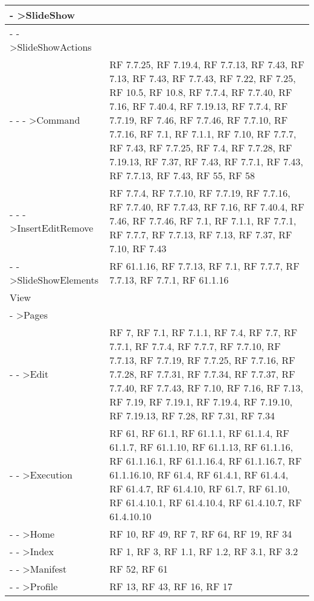 {\begin{longtable} [c]{| p{8cm} | p{5cm} |}
 \hline 
- >SlideShow & \\ 
 \hline 
- - >SlideShowActions & \\ 
 \hline 
- - - >Command & RF 7.7.25, RF 7.19.4, RF 7.7.13, RF 7.43, RF 7.13, RF 7.43, RF 7.7.43, RF 7.22, RF 7.25, RF 10.5, RF 10.8, RF 7.7.4, RF 7.7.40, RF 7.16, RF 7.40.4, RF 7.19.13, RF 7.7.4, RF 7.7.19, RF 7.46, RF 7.7.46, RF 7.7.10, RF 7.7.16, RF 7.1, RF 7.1.1, RF 7.10, RF 7.7.7, RF 7.43, RF 7.7.25, RF 7.4, RF 7.7.28, RF 7.19.13, RF 7.37, RF 7.43, RF 7.7.1, RF 7.43, RF 7.7.13, RF 7.43, RF 55, RF 58\\ 
 \hline 
- - - >InsertEditRemove & RF 7.7.4, RF 7.7.10, RF 7.7.19, RF 7.7.16, RF 7.7.40, RF 7.7.43, RF 7.16, RF 7.40.4, RF 7.46, RF 7.7.46, RF 7.1, RF 7.1.1, RF 7.7.1, RF 7.7.7, RF 7.7.13, RF 7.13, RF 7.37, RF 7.10, RF 7.43\\ 
 \hline 
- - >SlideShowElements & RF 61.1.16, RF 7.7.13, RF 7.1, RF 7.7.7, RF 7.7.13, RF 7.7.1, RF 61.1.16\\ 
 \hline 
View & \\ 
 \hline 
- >Pages & \\ 
 \hline 
- - >Edit & RF 7, RF 7.1, RF 7.1.1, RF 7.4, RF 7.7, RF 7.7.1, RF 7.7.4, RF 7.7.7, RF 7.7.10, RF 7.7.13, RF 7.7.19, RF 7.7.25, RF 7.7.16, RF 7.7.28, RF 7.7.31, RF 7.7.34, RF 7.7.37, RF 7.7.40, RF 7.7.43, RF 7.10, RF 7.16, RF 7.13, RF 7.19, RF 7.19.1, RF 7.19.4, RF 7.19.10, RF 7.19.13, RF 7.28, RF 7.31, RF 7.34\\ 
 \hline 
- - >Execution & RF 61, RF 61.1, RF 61.1.1, RF 61.1.4, RF 61.1.7, RF 61.1.10, RF 61.1.13, RF 61.1.16, RF 61.1.16.1, RF 61.1.16.4, RF 61.1.16.7, RF 61.1.16.10, RF 61.4, RF 61.4.1, RF 61.4.4, RF 61.4.7, RF 61.4.10, RF 61.7, RF 61.10, RF 61.4.10.1, RF 61.4.10.4, RF 61.4.10.7, RF 61.4.10.10\\ 
 \hline 
- - >Home & RF 10, RF 49, RF 7, RF 64, RF 19, RF 34\\ 
 \hline 
- - >Index & RF 1, RF 3, RF 1.1, RF 1.2, RF 3.1, RF 3.2\\ 
 \hline 
- - >Manifest & RF 52, RF 61\\ 
 \hline 
- - >Profile & RF 13, RF 43, RF 16, RF 17\\ 
 \hline 
\end{longtable}}